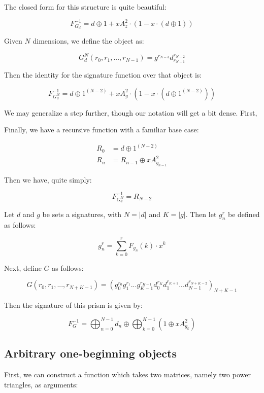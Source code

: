 \documentclass{article}
\begin{document}
\noindent The closed form for this structure is quite beautiful:

$$F_{G_d}^{-1} = d \oplus 1 + xA_z^2 \cdot (1 - x \cdot (d \oplus 1))$$

\noindent Given $N$ dimensions, we define the object as:

$$G_d^N (r_0, r_1, ..., r_{N-1}) = g^{r_{N-3}} d_{r_{N-1}}^{r_{N-2}}$$

\noindent Then the identity for the signature function over that object is:

$$F_{G_d^{N}}^{-1} = d \oplus 1^{(N-2)} + xA_g^2 \cdot (1 - x \cdot (d \oplus 1^{(N-2)}))$$

\noindent We may generalize a step further, though our notation will get a bit dense. First,

\noindent Finally, we have a recursive function with a familiar base case:

\begin{align*}
R_0 &= d \oplus 1^{(N-2)}\\ %
R_n &= R_{n-1} \oplus xA_{g_{n-1}}^2
\end{align*}

\noindent Then we have, quite simply:

$$F_{G_d^N}^{-1} = R_{N-2}$$
\fi

 Let $d$ and $g$ be sets a signatures, with $N = |d|$ and $K = |g|$. Then let $g_n^r$ be defined as follows:

$$g_n^r = \sum_{k=0}^{r} F_{g_n}(k) \cdot x^k$$

\noindent Next, define $G$ as follows:

$$G (r_0, r_1, ..., r_{N+K-1}) = \left(g_{0}^{r_0} g_{1}^{r_1} ... g_{K-1}^{r_{K-1}} d_{0}^{r_{K}} d_{1}^{r_{K+1}} ... d_{N-1}^{r_{N+K-2}} \right)_{N+K-1}$$

\noindent Then the signature of this prism is given by:

$$F_G^{-1} = \bigoplus_{n=0}^{N-1} d_n \oplus \bigoplus_{k=0}^{K-1} (1 \oplus xA_{g_k}^2)$$

\subsection{Arbitrary one-beginning objects}

\noindent First, we can construct a function which takes two matrices, namely two power triangles, as arguments:
\end{document}
